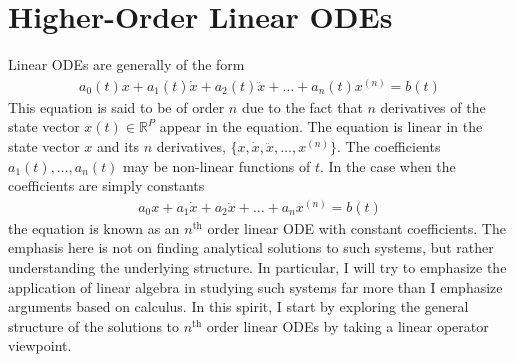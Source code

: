 \documentclass[12pt]{article}
\newcommand{\R}{\mathbb{R}}
\begin{document}
\section{Higher-Order Linear ODEs}
Linear ODEs are generally of the form 
\begin{align}
a_0(t)x + a_1(t) \dot{x} + a_2(t) \ddot{x} + \dots + a_n(t) x^{(n)} = b(t) \label{linear_ODE}
\end{align}
This equation is said to be of order $n$ due to the fact that $n$ derivatives of the state vector $x(t) \in \R^P$ appear in the equation. 
The equation is linear in the state vector $x$ and its $n$ derivatives, $\{x, \dot{x}, \ddot{x}, \dots, x^{(n)}\}$. The coefficients 
$a_1(t), \dots, a_n(t)$ may be non-linear functions of $t$. In the case when the coefficients are simply constants 
\begin{align*}
a_0 x + a_1 \dot{x} + a_2 \ddot{x} + \dots + a_n x^{(n)} = b(t)
\end{align*}
the equation is known as an $n^{\text{th}}$ order linear ODE with constant coefficients. The emphasis here is not on finding analytical solutions 
to such systems, but rather understanding the underlying structure. In particular, I will try to emphasize the application of linear algebra in studying 
such systems far more than I emphasize arguments based on calculus. In this spirit, I start by exploring the general structure of the solutions to 
$n^{\text{th}}$ order linear ODEs by taking a linear operator viewpoint. 
\end{document}
